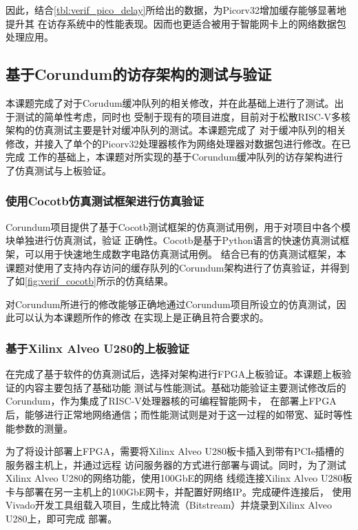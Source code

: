 因此，结合\autoref{tbl:verif_pico_delay}所给出的数据，为Picorv32增加缓存能够显著地提升其
在访存系统中的性能表现。因而也更适合被用于智能网卡上的网络数据包处理应用。

\subsection{基于Corundum的访存架构的测试与验证}

本课题完成了对于Corudum缓冲队列的相关修改，并在此基础上进行了测试。出于测试的简单性考虑，同时也
受制于现有的项目进度，目前对于松散RISC-V多核架构的仿真测试主要是针对缓冲队列的测试。本课题完成了
对于缓冲队列的相关修改，并接入了单个的Picorv32处理器核作为网络处理器对数据包进行修改。在已完成
工作的基础上，本课题对所实现的基于Corundum缓冲队列的访存架构进行了仿真测试与上板验证。

\subsubsection{使用Cocotb仿真测试框架进行仿真验证}

Corundum项目提供了基于Cocotb测试框架的仿真测试用例，用于对项目中各个模块单独进行仿真测试，验证
正确性。Cocotb是基于Python语言的快速仿真测试框架，可以用于快速地生成数字电路仿真测试用例\cite{cocotb_doc}。
结合已有的仿真测试框架，本课题对使用了支持内存访问的缓存队列的Corundum架构进行了仿真验证，并得到
了如\autoref{fig:verif_cocotb}所示的仿真结果。


对Corundum所进行的修改能够正确地通过Corundum项目所设立的仿真测试，因此可以认为本课题所作的修改
在实现上是正确且符合要求的。

\subsubsection{基于Xilinx Alveo U280的上板验证}

在完成了基于软件的仿真测试后，选择对架构进行FPGA上板验证。本课题上板验证的内容主要包括了基础功能
测试与性能测试。基础功能验证主要测试修改后的Corundum，作为集成了RISC-V处理器核的可编程智能网卡，
在部署上FPGA后，能够进行正常地网络通信；而性能测试则是对于这一过程的如带宽、延时等性能参数的测量。

为了将设计部署上FPGA，需要将Xilinx Alveo U280板卡插入到带有PCIe插槽的服务器主机上，并通过远程
访问服务器的方式进行部署与调试。同时，为了测试Xilinx Alveo U280的网络功能，使用100GbE的网络
线缆连接Xilinx Alveo U280板卡与部署在另一主机上的100GbE网卡，并配置好网络IP。完成硬件连接后，
使用Vivado开发工具组载入项目，生成比特流（Bitstream）并烧录到Xilinx Alveo U280上，即可完成
部署。

